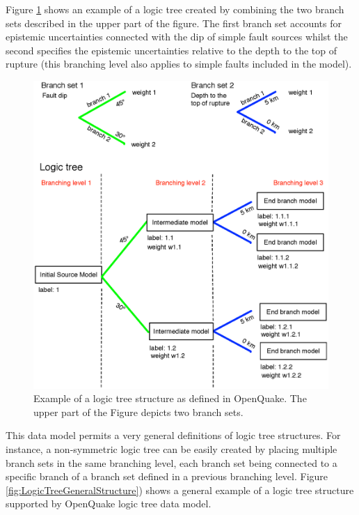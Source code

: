 Figure \ref{fig:logic_tree_schema} shows an example of a logic tree 
created by combining the two branch sets described in the upper part of the
figure. 
The first branch set accounts for epistemic uncertainties connected with 
the dip of simple fault sources whilst the second specifies 
the epistemic uncertainties relative to the depth to the top of rupture  
(this branching level also applies to simple faults included in the model).
\begin{figure}[!h]
\includegraphics[width=15cm]{./Figures/Part_Hazard/logic_tree_schema.eps}
\caption{Example of a logic tree structure as defined in OpenQuake. The upper
part of the Figure depicts two branch sets.}
\label{fig:logic_tree_schema}
\end{figure}
%

This data model permits a very general definitions of logic tree 
structures. For instance, a non-symmetric logic tree can be easily 
created by placing multiple branch sets in the same branching level, each 
branch set being connected to a specific branch of a branch set defined in a
previous branching level. Figure \ref{fig:LogicTreeGeneralStructure}) shows a 
general example of a logic tree structure supported by OpenQuake logic tree 
data model. 

